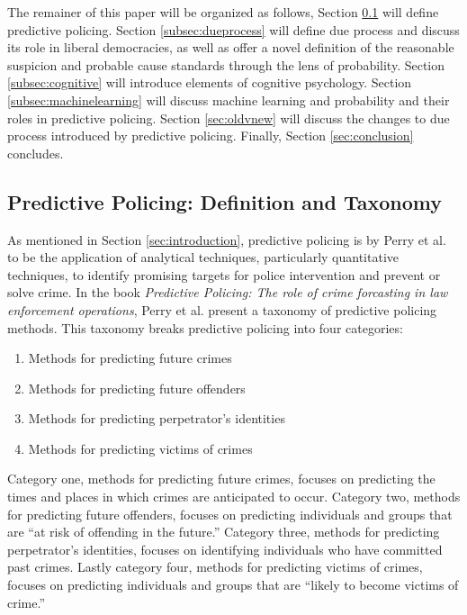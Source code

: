 \documentclass[12pt]{article} %
\newcommand{\hlfixme}[1]{\fxfatal{\hl{#1}}}
\begin{document}
The remainer of this paper will be organized as follows, Section \ref{subsec:predictivepolicing} will define predictive policing.
Section \ref{subsec:dueprocess} will define due process and discuss its role in liberal democracies, as well as offer a novel definition of the reasonable suspicion and probable cause standards through the lens of probability. Section \ref{subsec:cognitive} will introduce elements of cognitive psychology. Section \ref{subsec:machinelearning} will discuss machine learning and probability and their roles in predictive policing. Section \ref{sec:oldvnew} will discuss the changes to due process introduced by predictive policing. Finally, Section \ref{sec:conclusion} concludes.

\subsection{Predictive Policing: Definition and Taxonomy} \label{subsec:predictivepolicing}%

As mentioned in Section \ref{sec:introduction}, predictive policing is by Perry et al. to be the application of analytical techniques, particularly quantitative techniques, to identify promising targets for police intervention and prevent or solve crime. In the book \textit{Predictive Policing: The role of crime forcasting in law enforcement operations}, Perry et al. present a taxonomy of predictive policing methods. This taxonomy breaks predictive policing into four categories: \cite{perryetal}

\begin{enumerate}
\item Methods for predicting future crimes
\item Methods for predicting future offenders
\item Methods for predicting perpetrator's identities
\item Methods for predicting victims of crimes
\end{enumerate}

Category one, methods for predicting future crimes, focuses on predicting the times and places in which crimes are anticipated to occur. Category two, methods for predicting future offenders, focuses on predicting individuals and groups that are ``at risk of offending in the future.'' Category three, methods for predicting perpetrator's identities, focuses on identifying individuals who have committed past crimes. Lastly category four, methods for predicting victims of crimes, focuses on predicting individuals and groups that are ``likely to become victims of crime.''
\end{document}
